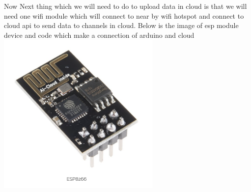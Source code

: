 Now Next thing which we will need to do to upload data in cloud is that we will need one wifi module which will connect to near by wifi hotspot and connect to cloud api to send data to channels in cloud. Below is the image of esp module device and code which make a connection of arduino and cloud\\

\includegraphics[width=0.6\textwidth]{images/esp.png}\\


